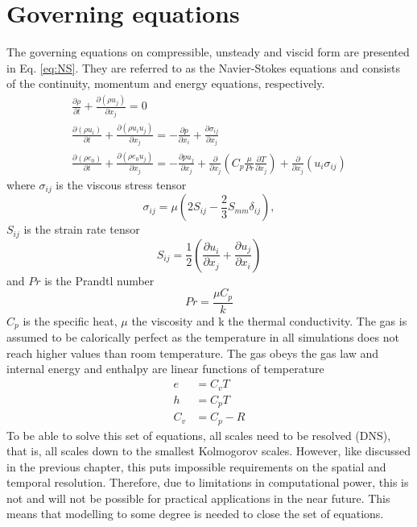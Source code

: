\section{Governing equations}
The governing equations on compressible, unsteady and viscid form are presented in Eq. \ref{eq:NS}. They are referred to as the Navier-Stokes equations and consists of the continuity, momentum and energy equations, respectively.
\begin{equation} 
  \label{eq:NS}
  \begin{gathered}
    \frac{\partial {\rho}}{\partial t} + \frac{\partial \left({\rho} {u}_j \right)}{\partial x_j} = 0 \\
    \frac{\partial \left( {\rho} {u}_i \right)}{\partial t} + \frac{\partial\left({\rho} {u}_i {u}_j \right)}{\partial x_j} = -\frac{\partial p}{\partial x_i} + \frac{\partial {\sigma} _{ij}}{\partial x_j} \\
    \frac{\partial \left( {\rho} {e}_0\right)}{\partial t} + \frac{\partial \left({\rho} {e}_0 {u}_j\right)}{\partial x_j}= -\frac{\partial {p}{u}_j}{\partial x_j}+\frac{\partial}{\partial x_j}\left(C_p\frac{\mu}{Pr}\frac{\partial {T}}{\partial x_j}\right)+\frac{\partial}{\partial x_j}\left({u}_i\sigma_{ij}\right)
  \end{gathered}
\end{equation}
where ${\sigma} _{ij}$ is the viscous stress tensor
\begin{equation}
  {\sigma} _{ij} = \mu \left(2{S}_{ij}-\frac{2}{3}{S}_{mm}\delta _{ij}\right),
\end{equation}
${S}_{ij}$ is the strain rate tensor
\begin{equation}
  {S}_{ij}=\frac{1}{2}\left(\frac{\partial {u}_i}{\partial x_j}+\frac{\partial {u}_j}{\partial x_i}\right)
\end{equation}
and $Pr$ is the Prandtl number
\begin{equation}
  Pr = \frac{\mu C_p}{k}
\end{equation}
$C_p$ is the specific heat, $\mu$ the viscosity and k the thermal conductivity. The gas is assumed to be calorically perfect as the temperature in all simulations does not reach higher values than room temperature. The gas obeys the gas law and internal energy and enthalpy are linear functions of temperature
\begin{equation}
  \begin{aligned}
    e &= C_vT \\
    h &= C_pT \\
    C_v &= C_p-R
\end{aligned}
\end{equation}
To be able to solve this set of equations, all scales need to be resolved (DNS), that is, all scales down to the smallest Kolmogorov scales. However, like discussed in the previous chapter, this puts impossible requirements on the spatial and temporal resolution. Therefore, due to limitations in computational power, this is not and will not be possible for practical applications in the near future. This means that modelling to some degree is needed to close the set of equations. 

